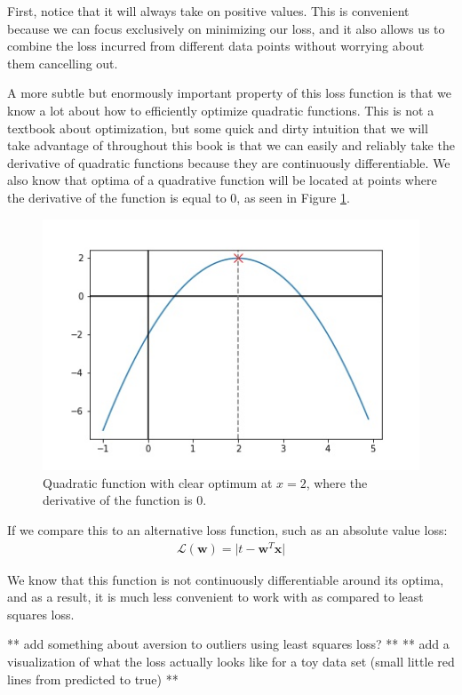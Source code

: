 First, notice that it will always take on positive values. This is convenient because we can focus exclusively on minimizing our loss, and it also allows us to combine the loss incurred from different data points without worrying about them cancelling out.

A more subtle but enormously important property of this loss function is that we know a lot about how to efficiently optimize quadratic functions. This is not a textbook about optimization, but some quick and dirty intuition that we will take advantage of throughout this book is that we can easily and reliably take the derivative of quadratic functions because they are continuously differentiable. We also know that optima of a quadrative function will be located at points where the derivative of the function is equal to 0, as seen in Figure \ref{fig:quad-deriv-at-2}.

\begin{figure}
    \centering
    \includegraphics[width=0.5\paperwidth]{../LinearRegression/fig/deriv_at_2_GEN.jpg}
    \caption{Quadratic function with clear optimum at $x=2$, where the derivative of the function is 0.}
    \label{fig:quad-deriv-at-2}
\end{figure}

If we compare this to an alternative loss function, such as an absolute value loss:
\begin{align}
    \mathcal{L}(\textbf{w}) = \lvert t - \textbf{w}^{T}\textbf{x} \rvert
\end{align}

We know that this function is not continuously differentiable around its optima, and as a result, it is much less convenient to work with as compared to least squares loss.

** add something about aversion to outliers using least squares loss? **
** add a visualization of what the loss actually looks like for a toy data set (small little red lines from predicted to true) **

